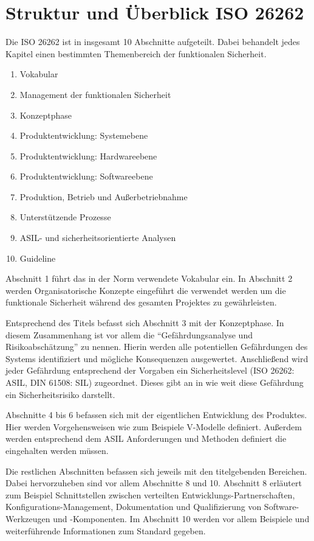 \documentclass[a4paper,DIV=calc,ngerman]{scrartcl}
\begin{document}
\section{Struktur und Überblick ISO 26262}
\label{sec:Struktur}
Die ISO 26262 ist in insgesamt 10 Abschnitte aufgeteilt. Dabei behandelt jedes Kapitel einen bestimmten Themenbereich der funktionalen Sicherheit.

\begin{enumerate}
    \item Vokabular
    \item Management der funktionalen Sicherheit
    \item Konzeptphase
    \item Produktentwicklung: Systemebene
    \item Produktentwicklung: Hardwareebene
    \item Produktentwicklung: Softwareebene
    \item Produktion, Betrieb und Außerbetriebnahme
    \item Unterstützende Prozesse
    \item ASIL- und sicherheitsorientierte Analysen
    \item Guideline
\end{enumerate}

Abschnitt 1 führt das in der Norm verwendete Vokabular ein. In Abschnitt 2 werden Organisatorische Konzepte eingeführt die verwendet werden um die funktionale Sicherheit während des gesamten Projektes zu gewährleisten.

Entsprechend des Titels befasst sich Abschnitt 3 mit der Konzeptphase. In diesem Zusammenhang ist vor allem die "`Gefährdungsanalyse und Risikoabschätzung"' zu nennen. Hierin werden alle potentiellen Gefährdungen des Systems identifiziert und mögliche Konsequenzen ausgewertet. Anschließend wird jeder Gefährdung entsprechend der Vorgaben ein Sicherheitslevel (ISO 26262: ASIL, DIN 61508: SIL) zugeordnet. Dieses gibt an in wie weit diese Gefährdung ein Sicherheitsrisiko darstellt.

Abschnitte 4 bis 6 befassen sich mit der eigentlichen Entwicklung des Produktes. Hier werden Vorgehensweisen wie zum Beispiele V-Modelle definiert. Außerdem werden entsprechend dem ASIL Anforderungen und Methoden definiert die eingehalten werden müssen.

Die restlichen Abschnitten befassen sich jeweils mit den titelgebenden Bereichen. Dabei hervorzuheben sind vor allem Abschnitte 8 und 10. Abschnitt 8 erläutert zum Beispiel Schnittstellen zwischen verteilten Entwicklungs-Partnerschaften, Konfigurations-Management, Dokumentation und Qualifizierung von Software-Werkzeugen und -Komponenten. Im Abschnitt 10 werden vor allem Beispiele und weiterführende Informationen zum Standard gegeben.
\end{document}
